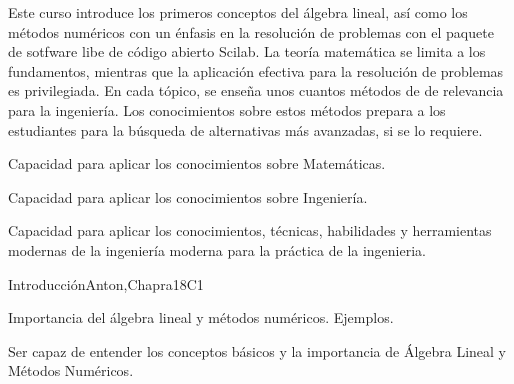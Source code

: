 \begin{syllabus}


\begin{justification}
Este curso introduce los primeros conceptos del álgebra lineal, así como los métodos numéricos con un énfasis en la resolución de problemas
con el paquete de sotfware libe de código abierto Scilab.
La teoría matemática se limita a los fundamentos, mientras que la aplicación efectiva para la resolución de problemas es privilegiada. 
En cada tópico, se enseña unos cuantos métodos de de relevancia para la ingeniería. 
Los conocimientos sobre estos métodos prepara a los estudiantes para la búsqueda de alternativas más avanzadas, si se lo requiere.
\end{justification}

\begin{goals}
\item Capacidad para aplicar los conocimientos sobre Matemáticas.
\item Capacidad para aplicar los conocimientos sobre Ingeniería.
\item Capacidad para aplicar los conocimientos, técnicas, habilidades y herramientas modernas de la ingeniería moderna para la práctica de la ingenieria.
\end{goals}

\begin{outcomes}
    \item {}
    \item {}
\end{outcomes}

\begin{competences}
    \item {} 
    \item {} 
    \item {} 
\end{competences}

\begin{unit}{Introducción}{}{Anton,Chapra}{18}{C1}
  \begin{topics}
      \item Importancia del álgebra lineal y métodos numéricos. Ejemplos.
   \end{topics}

   \begin{learningoutcomes}
      \item Ser capaz de entender los conceptos básicos y la importancia de Álgebra Lineal y Métodos Numéricos.
   \end{learningoutcomes}
\end{unit}


\end{syllabus}
